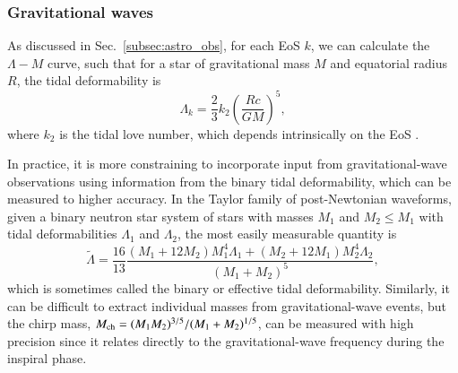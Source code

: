 \documentclass[aps,prd,nofootinbib,tightenlines,notitlepage,floatfix,superscriptaddress,showkeys,twocolumn]{revtex4-1}
\begin{document}
\subsubsection{Gravitational waves}

As discussed in Sec.~\ref{subsec:astro_obs}, for each EoS $k$, we can calculate the $\Lambda-M$ curve, such that for a star of gravitational mass $M$ and equatorial radius $R$, the tidal deformability is
\begin{equation}
    \Lambda_k = \dfrac{2}{3}k_2\left(\dfrac{R c}{G M}\right)^5,
\end{equation}
where $k_2$ is the tidal love number, which depends intrinsically on the EoS \cite{hinderer2008tidal,hinderer2009erratum}. 

In practice, it is more constraining to incorporate input from gravitational-wave observations using information from the binary tidal deformability, which can be measured to higher accuracy. In the Taylor family of post-Newtonian waveforms, given a binary neutron star system of stars with masses $M_1$ and $M_2 \leq M_1$ with tidal deformabilities $\Lambda_1$ and $\Lambda_2$, the most easily measurable quantity is \cite{wade2014systematic}
\begin{equation}
    \tilde{\Lambda} = \dfrac{16}{13}\dfrac{(M_1 + 12M_2)M_1^4\Lambda_1 + (M_2 + 12M_1)M_2^4\Lambda_2}{(M_1 + M_2)^5},
\end{equation}
which is sometimes called the binary or effective tidal deformability. Similarly, it can be difficult to extract individual masses from gravitational-wave events, but the chirp mass, $M_{\rm ch}  = (M_1 M_2)^{3/5}/(M_1 + M_2)^{1/5}$, can be measured with high precision since it relates directly to the gravitational-wave frequency during the inspiral phase. 
\end{document}
